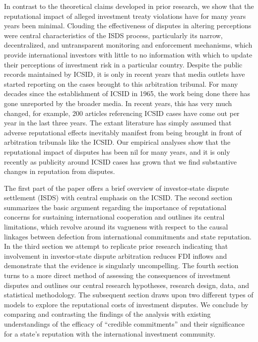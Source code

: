 \documentclass[12pt,onesided]{amsart}
\begin{document}
In contrast to the theoretical claims developed in prior research, we show that the reputational impact of alleged investment treaty violations have for many years years been minimal. Clouding the effectiveness of disputes in altering perceptions were central characteristics of the ISDS process, particularly its narrow, decentralized, and untransparent monitoring and enforcement mechanisms, which provide international investors with little to no information with which to update their perceptions of investment risk in a particular country. Despite the public records maintained by ICSID, it is only in recent years that media outlets have started reporting on the cases brought to this arbitration tribunal. For many decades since the establishment of ICSID in 1965, the work being done there has gone unreported by the broader media. In recent years, this has very much changed, for example, 200 articles referencing ICSID cases have come out per year in the last three years. The extant literature has simply assumed that adverse reputational effects inevitably manifest from being brought in front of arbitration tribunals like the ICSID. Our empirical analyses show that the reputational impact of disputes has been nil for many years, and it is only recently as publicity around ICSID cases has grown that we find substantive changes in reputation from disputes.

The first part of the paper offers a brief overview of investor-state dispute settlement (ISDS) with central emphasis on the ICSID. The second section summarizes the basic argument regarding the importance of reputational concerns for sustaining international cooperation and outlines its central limitations, which revolve around its vagueness with respect to the causal linkages between defection from international commitments and state reputation. In the third section we attempt to replicate prior research indicating that involvement in investor-state dispute arbitration reduces FDI inflows and demonstrate that the evidence is singularly uncompelling. The fourth section turns to a more direct method of assessing the consequences of investment disputes and outlines our central research hypotheses, research design, data, and statistical methodology. The subsequent section draws upon two different types of models to explore the reputational costs of investment disputes. We conclude by comparing and contrasting the findings of the analysis with existing understandings of the efficacy of ``credible commitments'' and their significance for a state's reputation with the international investment community.
\end{document}
